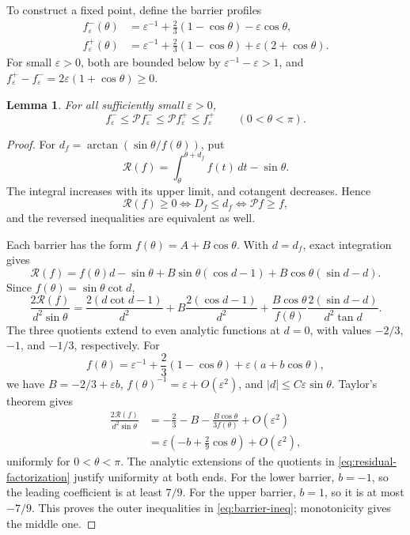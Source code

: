 \documentclass[11pt]{article}
\numberwithin{equation}{section}
\newtheorem{lemma}[theorem]{Lemma}
\newcommand{\eps}{\varepsilon}
\newcommand{\abs}[1]{\lvert #1\rvert}
\begin{document}
To construct a fixed point, define the barrier profiles
\begin{equation}\label{eq:barriers}
\begin{aligned}
  f_\eps^-(\theta)&=\eps^{-1}+\frac23(1-\cos\theta)-\eps\cos\theta,\\
  f_\eps^+(\theta)&=\eps^{-1}+\frac23(1-\cos\theta)+\eps(2+\cos\theta).
\end{aligned}
\end{equation}
For small \(\eps>0\), both are bounded below by \(\eps^{-1}-\eps>1\), and
\(f_\eps^+-f_\eps^-=2\eps(1+\cos\theta)\geq0\).

\begin{lemma}\label{lem:barriers}
For all sufficiently small \(\eps>0\),
\begin{equation}\label{eq:barrier-ineq}
  f_\eps^-\leq\mathcal P f_\eps^-\leq\mathcal P f_\eps^+
  \leq f_\eps^+\qquad(0<\theta<\pi).
\end{equation}
\end{lemma}

\begin{proof}
For \(d_f=\arctan(\sin\theta/f(\theta))\), put
\[
  \mathcal R(f)=\int_\theta^{\theta+d_f}f(t)\,dt-\sin\theta.
\]
The integral increases with its upper limit, and cotangent decreases. Hence
\[
  \mathcal R(f)\geq0\iff D_f\leq d_f\iff\mathcal P f\geq f,
\]
and the reversed inequalities are equivalent as well.

Each barrier has the form \(f(\theta)=A+B\cos\theta\). With \(d=d_f\),
exact integration gives
\begin{equation}\label{eq:residual}
  \mathcal R(f)=f(\theta)d-\sin\theta
  +B\sin\theta(\cos d-1)+B\cos\theta(\sin d-d).
\end{equation}
Since \(f(\theta)=\sin\theta\cot d\),
\begin{equation}\label{eq:residual-factorization}
  \frac{2\mathcal R(f)}{d^2\sin\theta}
  =\frac{2(d\cot d-1)}{d^2}
   +B\frac{2(\cos d-1)}{d^2}
   +\frac{B\cos\theta}{f(\theta)}
        \frac{2(\sin d-d)}{d^2\tan d}.
\end{equation}
The three quotients extend to even analytic functions at \(d=0\), with values
\(-2/3\), \(-1\), and \(-1/3\), respectively. For
\[
  f(\theta)=\eps^{-1}+\frac23(1-\cos\theta)
     +\eps(a+b\cos\theta),
\]
we have \(B=-2/3+\eps b\), \(f(\theta)^{-1}=\eps+O(\eps^2)\), and
\(\abs d\leq C\eps\sin\theta\). Taylor's theorem gives
\begin{equation}\label{eq:barrier-expansion}
\begin{aligned}
  \frac{2\mathcal R(f)}{d^2\sin\theta}
  &=-\frac23-B-\frac{B\cos\theta}{3f(\theta)}+O(\eps^2)\\
  &=\eps\left(-b+\frac29\cos\theta\right)+O(\eps^2),
\end{aligned}
\end{equation}
uniformly for \(0<\theta<\pi\). The analytic extensions of the quotients in
\eqref{eq:residual-factorization} justify uniformity at both ends. For the
lower barrier, \(b=-1\), so the leading coefficient is at least \(7/9\).
For the upper barrier, \(b=1\), so it is at most \(-7/9\). This proves the
outer inequalities in \eqref{eq:barrier-ineq}; monotonicity gives the middle
one.
\end{proof}
\end{document}
